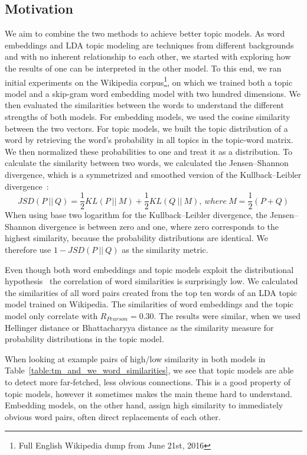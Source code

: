 \documentclass[
        a4paper,
        titlepage,
        twoside,
        parskip,
        numbers=noenddot
        ]{scrbook}
\theoremstyle{break}
\begin{document}
\subsection{Motivation}
We aim to combine the two methods to achieve better topic models.
As word embeddings and LDA topic modeling are techniques from different backgrounds and with no inherent relationship to each other, we started with exploring how the results of one can be interpreted in the other model.
To this end, we ran initial experiments on the Wikipedia corpus\footnote{Full English Wikipedia dump from June 21st, 2016}, on which we trained both a topic model and a skip-gram word embedding model with two hundred dimensions.
We then evaluated the similarities between the words to understand the different strengths of both models.
For embedding models, we used the cosine similarity between the two vectors.
For topic models, we built the topic distribution of a word by retrieving the word's probability in all topics in the topic-word matrix.
We then normalized these probabilities to one and treat it as a distribution.
To calculate the similarity between two words, we calculated the Jensen--Shannon divergence, which is a symmetrized and smoothed version of the Kullback--Leibler divergence~\cite{Kullback1951}:
\begin{equation*}
  JSD(P~||~Q) = \frac{1}{2} KL(P~||~M) + \frac{1}{2} KL(Q~||~M),~where~M = \frac{1}{2} ( P + Q)
\end{equation*}
When using base two logarithm for the Kullback--Leibler divergence, the Jensen--Shannon divergence is between zero and one, where zero corresponds to the highest similarity, because the probability distributions are identical.
We therefore use $1 - JSD(P~||~Q)$ as the similarity metric.

Even though both word embeddings and topic models exploit the distributional hypothesis~\cite{Firth1957} the correlation of word similarities is surprisingly low.
We calculated the similarities of all word pairs created from the top ten words of an LDA topic model trained on Wikipedia.
The similarities of word embeddings and the topic model only correlate with $R_{Pearson} = 0.30$.
The results were similar, when we used Hellinger distance or Bhattacharyya distance as the similarity measure for probability distributions in the topic model.

When looking at example pairs of high/low similarity in both models in Table~\ref{table:tm_and_we_word_similarities}, we see that topic models are able to detect more far-fetched, less obvious connections.
This is a good property of topic models, however it sometimes makes the main theme hard to understand.
Embedding models, on the other hand, assign high similarity to immediately obvious word pairs, often direct replacements of each other.
\end{document}
